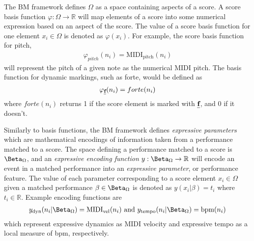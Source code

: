 The BM framework defines $\Omega$ as a space containing aspects of a score. A score basis function $\varphi: \Omega \rightarrow \mathbb{R}$ will map elements of a score into some numerical expression based on an aspect of the score. The value of a score basis function for one element $x_i \in \Omega$ is denoted as $\varphi (x_i)$. For example, the score basis function for pitch, 
\begin{align*}
\varphi_{pitch} (n_i) = \textrm{MIDI}_{\textrm{pitch}}(n_i)   
\end{align*}
will represent the pitch of a given note as the numerical MIDI pitch. The basis function for dynamic markings, such as forte, would be defined as 
\begin{align*}
\varphi_{\textbf{\emph{f}}} (n_i) = forte(n_i)   
\end{align*}
where $forte(n_i)$ returns 1 if the score element is marked with $\textbf{\emph{f}}$, and 0 if it doesn't. 

Similarly to basis functions, the BM framework defines \emph{expressive parameters} which are mathematical encodings of information taken from a performance matched to a score. The space defining a performance matched to a score is $\mperf$, and an \emph{expressive encoding function} $y: \mperf \rightarrow \mathbb{R}$ will encode an event in a matched performance into an \emph{expressive parameter}, or performance feature. The value of each parameter corresponding to a score element $x_{i} \in \Omega$ given a matched performance $\beta \in \mperf$ is denoted as $y(x_i \vert \beta) = t_i$ where $t_i \in \mathbb{R}$. Example encoding functions are 
\begin{align*}
y_{\textrm{dyn}}(n_i \vert \mperf) = \textrm{MIDI}_{\textrm{vel}}(n_i) \textrm{ and } y_{\textrm{tempo}}(n_i \vert \mperf) = \textrm{bpm}(n_i)
\end{align*}
which represent expressive dynamics as MIDI velocity and expressive tempo as a local measure of bpm, respectively. 


